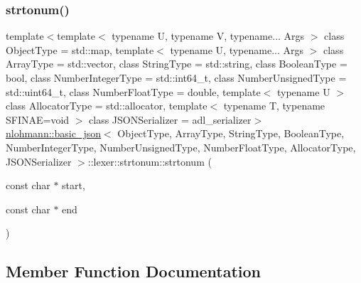 \subsubsection{\texorpdfstring{strtonum()}{strtonum()}}
{\footnotesize\ttfamily template$<$template$<$ typename U, typename V, typename... Args $>$ class Object\+Type = std\+::map, template$<$ typename U, typename... Args $>$ class Array\+Type = std\+::vector, class String\+Type  = std\+::string, class Boolean\+Type  = bool, class Number\+Integer\+Type  = std\+::int64\+\_\+t, class Number\+Unsigned\+Type  = std\+::uint64\+\_\+t, class Number\+Float\+Type  = double, template$<$ typename U $>$ class Allocator\+Type = std\+::allocator, template$<$ typename T, typename S\+F\+I\+N\+A\+E=void $>$ class J\+S\+O\+N\+Serializer = adl\+\_\+serializer$>$ \\
\mbox{\hyperlink{classnlohmann_1_1basic__json}{nlohmann\+::basic\+\_\+json}}$<$ Object\+Type, Array\+Type, String\+Type, Boolean\+Type, Number\+Integer\+Type, Number\+Unsigned\+Type, Number\+Float\+Type, Allocator\+Type, J\+S\+O\+N\+Serializer $>$\+::lexer\+::strtonum\+::strtonum (\begin{DoxyParamCaption}\item[{const char $\ast$}]{start,  }\item[{const char $\ast$}]{end }\end{DoxyParamCaption})\hspace{0.3cm}{\ttfamily [inline]}}



\subsection{Member Function Documentation}
\mbox{\label{structnlohmann_1_1basic__json_1_1lexer_1_1strtonum_af1b3dc99a67a854750437a60a22f4989}} 
